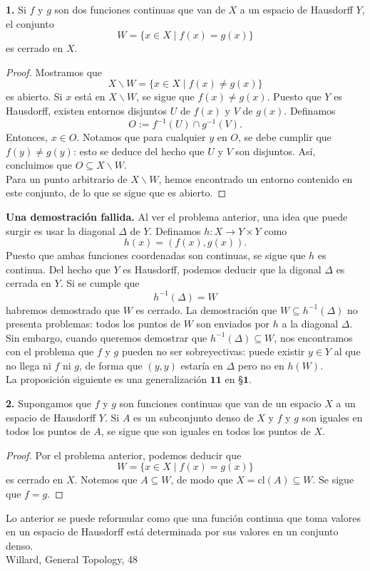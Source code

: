 \documentclass{article}
\begin{document}
\begin{mybox}
	\textbf{1.} Si $f$ y $g$ son dos funciones continuas que van de $X$ a un espacio de Hausdorff $Y$, el conjunto
	$$ W =  \{ x \in X \mid f(x) = g(x)  \} $$
	es cerrado en $X$.
\end{mybox}
\begin{proof}
	Mostramos que 
	$$ X \backslash W = \{ x \in X \mid f(x) \neq g(x) \} $$
	es abierto. Si $x$ está en $X \backslash W$, se sigue que $f(x) \neq g(x)$. Puesto que $Y$ es Hausdorff, existen entornos disjuntos $U$ de $f(x)$ y $V$ de $g(x)$. Definamos 
	$$ O := f^{-1}(U) \cap g^{-1}(V). $$
	Entonces, $x \in O$.  Notamos que para cualquier $y$ en $O$, se debe cumplir que $f(y) \neq g(y)$: esto se deduce del hecho que $U$ y $V$ son disjuntos. Así, concluimos que $O \subseteq X \backslash W$. \\
	Para un punto arbitrario de $X \backslash W$, hemos encontrado un entorno contenido en este conjunto, de lo que se sigue que es abierto. 	
\end{proof}	

\textbf{Una demostración fallida. } Al ver el problema anterior, una idea que puede surgir es usar la diagonal $\Delta$ de $Y$. Definamos $h: X \rightarrow Y \times Y$ como 
$$ h(x) = ( f(x), g(x) ). $$
Puesto que ambas funciones coordenadas son continuas, se sigue que $h$ es continua. Del hecho que $Y$ es Hausdorff, podemos deducir que la digonal $\Delta$ es cerrada en $Y$. Si se cumple que
$$ h^{-1}(\Delta) = W $$
habremos demostrado que $W$ es cerrado. La demostración que $W \subseteq h^{-1}(\Delta)$ no presenta problemas: todos los puntos de $W$ son enviados por $h$ a la diagonal $\Delta$. 
Sin embargo, cuando queremos demostrar que $h^{-1}(\Delta) \subseteq W$, nos encontramos con el problema que $f$ y $g$ pueden no ser sobreyectivas: puede existir $y \in Y$ al que no llega ni $f$ ni $g$, de forma que $(y, y)$ estaría en $\Delta$ pero no en $h(W)$.\\

La proposición siguiente es una generalización $\mathbf{11}$ en §$\mathbf{1}$.

\begin{mybox}
	\textbf{2. } Supongamos que $f$ y $g$ son funciones continuas que van de un espacio $X$ a un espacio de Hausdorff $Y$. Si $A$ es un subconjunto denso de $X$ y $f$ y $g$ son iguales en todos los puntos de $A$, se sigue que son iguales en todos los puntos de $X$. 
\end{mybox}	
\begin{proof}
	Por el problema anterior, podemos deducir que 
	$$ W = \{ x \in X \mid f(x) = g(x) \}$$
	es cerrado en $X$. Notemos que $A \subseteq W$, de modo que $X = \text{cl}(A) \subseteq W$. Se sigue que $f = g$. 
\end{proof}

Lo anterior se puede reformular como que una función continua que toma valores en un espacio de Hausdorff está determinada por sus valores en un conjunto denso. \\

Willard, General Topology, 48
\end{document}
